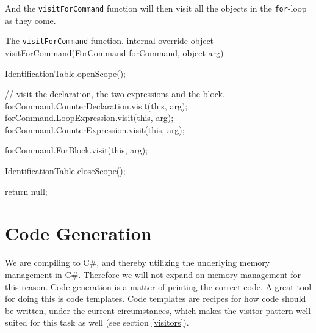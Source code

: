 And the \texttt{visitForCommand} function will then visit all the objects in the \texttt{for}-loop as they come.
\newline
\begin{source}{The \texttt{visitForCommand} function.}{}
internal override object visitForCommand(ForCommand forCommand, object arg)
		{
				IdentificationTable.openScope();

        // visit the declaration, the two expressions and the block.
        forCommand.CounterDeclaration.visit(this, arg);
        forCommand.LoopExpression.visit(this, arg);
        forCommand.CounterExpression.visit(this, arg);

        forCommand.ForBlock.visit(this, arg);

        IdentificationTable.closeScope();
						
        return null;
    }
\end{source}

\section{Code Generation}
We are compiling to C\#, and thereby utilizing the underlying memory management in C\#. Therefore we will not expand on memory management for this reason.
Code generation is a matter of printing the correct code. \newline
A great tool for doing this is code templates. 
Code templates are recipes for how code should be written, under the current circumstances, which makes the visitor pattern well suited for this task as well (see section \ref{visitors}).